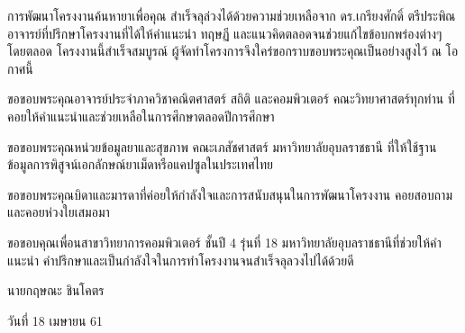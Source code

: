 \begin{acknowledgements}
    การพัฒนาโครงงานค้นหายาเพื่อคุณ สำเร็จลุล่วงได้ด้วยความช่วยเหลือจาก ดร.เกรียงศักดิ์ ตรีประพิณ 
    อาจารย์ที่ปรึกษาโครงงานที่ได้ให้คำแนะนำ ทฤษฏี และแนวคิดตลอดจนช่วยแก้ไขข้อบกพร่องต่างๆ 
    โดยตลอด โครงงานนี้สำเร็จสมบูรณ์ ผู้จัดทำโครงการจึงใคร่ขอกราบขอบพระคุณเป็นอย่างสูงไว้ ณ โอกาศนี้
    
    ขอขอบพระคุณอาจารย์ประจำภาควิชาคณิตศาสตร์ สถิติ และคอมพิวเตอร์ คณะวิทยาศาสตร์ทุกท่าน 
    ที่คอยให้คำแนะนำและช่วยเหลือในการศึกษาตลอดปีการศึกษา
    
    ขอขอบพระคุณหน่วยข้อมูลยาและสุขภาพ คณะเภสัชศาสตร์ มหาวิทยาลัยอุบลราชธานี 
    ที่ให้ใช้ฐานข้อมูลการพิสูจน์เอกลักษณ์ยาเม็ดหรือแคปซูลในประเทศไทย

    ขอขอบพระคุณบิดาและมารดาที่ค่อยให้กำลังใจและการสนับสนุนในการพัฒนาโครงงาน 
    คอยสอบถามและคอยห่วงใยเสมอมา
    
    ขอขอบคุณเพื่อนสาขาวิทยาการคอมพิวเตอร์ ชั้นปี 4 รุ่นที่ 18 มหาวิทยาลัยอุบลราชธานีที่ช่วยให้คำแนะนำ 
    คำปรึกษาและเป็นกำลังใจในการทำโครงงานจนสำเร็จลุลวงไปได้ด้วยดี

\end{acknowledgements}

\begin{flushright}
    นายกฤษณะ ชินโคตร
    \vspace{-5mm}
    
    วันที่ 18 เมษายน 61
\end{flushright}
